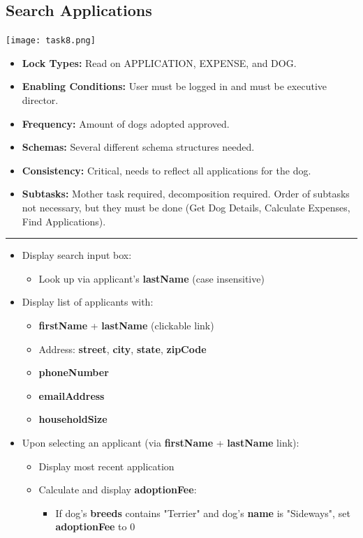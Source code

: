\documentclass{article}
\begin{document}
\subsection{Search Applications}
\begin{center}
    \texttt{[image: task8.png]}
\end{center}
\begin{itemize}
    \item \textbf{Lock Types:} Read on APPLICATION, EXPENSE, and DOG.
    \item \textbf{Enabling Conditions:} User must be logged in and must be executive director.
    \item \textbf{Frequency:} Amount of dogs adopted approved.
    \item \textbf{Schemas:} Several different schema structures needed.
    \item \textbf{Consistency:} Critical, needs to reflect all applications for the dog.
    \item \textbf{Subtasks:} Mother task required, decomposition required. Order of subtasks not necessary, but they must be done (Get Dog Details, Calculate Expenses, Find Applications).
\end{itemize}
\noindent\rule{8cm}{0.4pt}
\begin{itemize}
    \item Display search input box:
    \begin{itemize}
        \item Look up via applicant's 	\textbf{lastName} (case insensitive)
    \end{itemize}
    \item Display list of applicants with:
    \begin{itemize}
        \item 	\textbf{firstName} + 	\textbf{lastName} (clickable link)
        \item Address: 	\textbf{street}, 	\textbf{city}, 	\textbf{state}, 	\textbf{zipCode}
        \item 	\textbf{phoneNumber}
        \item 	\textbf{emailAddress}
        \item 	\textbf{householdSize}
    \end{itemize}
    \item Upon selecting an applicant (via 	\textbf{firstName} + 	\textbf{lastName} link):
    \begin{itemize}
        \item Display most recent application
        \item Calculate and display 	\textbf{adoptionFee}:
        \begin{itemize}
            \item If dog's 	\textbf{breeds} contains "Terrier" and dog's 	\textbf{name} is "Sideways", set 	\textbf{adoptionFee} to 0
        \end{itemize}
    \end{itemize}
\end{itemize}
\end{document}
